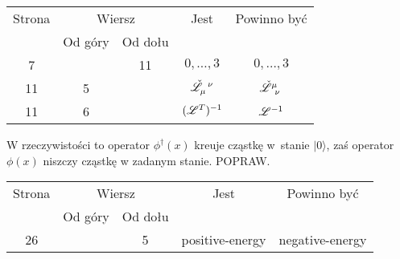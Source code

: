 \documentclass[a4paper,11pt]{article}
\begin{document}
\begin{center}

  \begin{tabular}{|c|c|c|c|c|}
    \hline
    Strona & \multicolumn{2}{c|}{Wiersz} & Jest
                              & Powinno być \\ \cline{2-3}
    & Od góry & Od dołu & & \\
    \hline
    7   & & 11 & $0, \ldots,\!3$ & $0, \ldots, 3$ \\
    11  &  5 & & $\tensor[]{ \check{ \Lcal } }{ _{ \mu }^{ \nu } }$
           & $\tensor[]{ \check{ \Lcal } }{ ^{ \mu }_{ \nu } }$ \\
    11  &  6 & & $( \mathcal{L}^{ T } )^{ -1 }$ & $\mathcal{L}^{ -1 }$ \\
    \hline
  \end{tabular}

\end{center}

\vspace{\spaceTwo}












\newpage


\vspace{0em}



\vspace{0em}


\noindent
{} W rzeczywistości to operator $\phi^{ \dagger }( x )$ kreuje cząstkę
w~stanie $| 0 \rangle$, zaś operator $\phi( x )$ niszczy cząstkę w zadanym stanie.
POPRAW.





\begin{center}

  \begin{tabular}{|c|c|c|c|c|}
    \hline
    Strona & \multicolumn{2}{c|}{Wiersz} & Jest
                              & Powinno być \\ \cline{2-3}
    & Od góry & Od dołu & & \\
    \hline
    26  & &  5 & positive-energy & negative-energy \\
    \hline
  \end{tabular}

\end{center}
\end{document}
